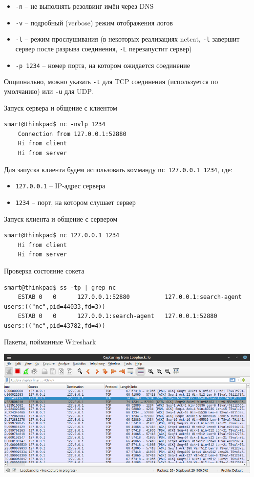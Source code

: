 \begin{itemize}
    \item \texttt{-n} -- не выполнять резолвинг имён через DNS
    \item \texttt{-v} -- подробный (verbose) режим отображения логов
    \item \texttt{-l} -- режим прослушивания (в некоторых реализациях netcat, \texttt{-l} завершит сервер после разрыва соединения, \texttt{-L} перезапустит сервер)
    \item \texttt{-p 1234} -- номер порта, на котором ожидается соединение
\end{itemize}

Опционально, можно указать \texttt{-t} для TCP соединения (используется по умолчанию) или \texttt{-u} для UDP.

Запуск сервера и общение с клиентом
\begin{Verbatim}[frame=single]
    smart@thinkpad$ nc -nvlp 1234
    Connection from 127.0.0.1:52880
    Hi from client
    Hi from server
\end{Verbatim}

Для запуска клиента будем использовать комманду \texttt{nc 127.0.0.1 1234}, где:
\begin{itemize}
    \item \texttt{127.0.0.1} -- IP-адрес сервера
    \item \texttt{1234} -- порт, на котором слушает сервер
\end{itemize}

Запуск клиента и общение с сервером
\begin{Verbatim}[frame=single]
    smart@thinkpad$ nc 127.0.0.1 1234
    Hi from client
    Hi from server
\end{Verbatim}

Проверка состояние сокета
\begin{Verbatim}[frame=single]
    smart@thinkpad$ ss -tp | grep nc
    ESTAB 0   0      127.0.0.1:52880          127.0.0.1:search-agent users:(("nc",pid=44033,fd=3))              
    ESTAB 0   0      127.0.0.1:search-agent   127.0.0.1:52880        users:(("nc",pid=43782,fd=4)) 
\end{Verbatim}

Пакеты, пойманные Wireshark
\begin{center}
    \includegraphics[scale=0.55]{res/7.wireshark-nc-chat.png}
\end{center}


